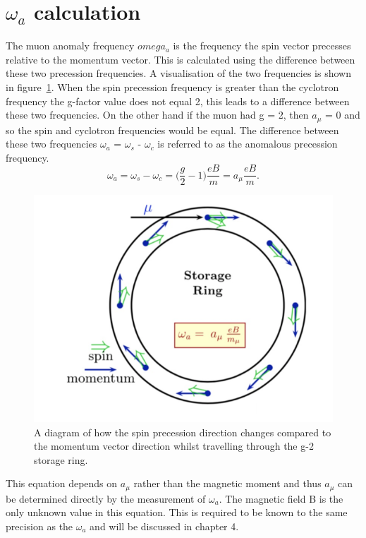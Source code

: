 \section{$\omega_{a}$ calculation}

The muon anomaly frequency $omega_{a}$ is the frequency the spin vector precesses relative to the momentum vector. This is calculated using the difference between these two precession frequencies. A visualisation of the two frequencies is shown in figure~\ref{fig:spin_mom_diff}. When the spin precession frequency is greater than the cyclotron frequency the g-factor value does not equal 2, this leads to a difference between these two frequencies. On the other hand if the muon had g = 2, then $a_{\mu}$ = 0 and so the spin and cyclotron frequencies would be equal.
The difference between these two frequencies $\omega_{a}$ = $\omega_{s}$ - $\omega_{c}$ is referred to as the anomalous precession frequency. 
\begin{equation}
\omega_{a} = \omega_{s} - \omega_{c} = \bigg(\frac{g}{2}-1\bigg)\frac{eB}{m} = a_{\mu}\frac{eB}{m}.
\end{equation}

\begin{figure}[th]
\centering
\includegraphics[scale=0.9]{Figures/spin_mom_diff}
\decoRule
\caption{A diagram of how the spin precession direction changes compared to the momentum vector direction whilst travelling through the g-2 storage ring.}
\label{fig:spin_mom_diff}
\end{figure}

This equation depends on $a_\mu$ rather than the magnetic moment and thus $a_\mu$ can be determined directly by the measurement of $\omega_{a}$. The magnetic field B is the only unknown value in this equation. This is required to be known to the same precision as the $\omega_{a}$ and will be discussed in chapter 4.


